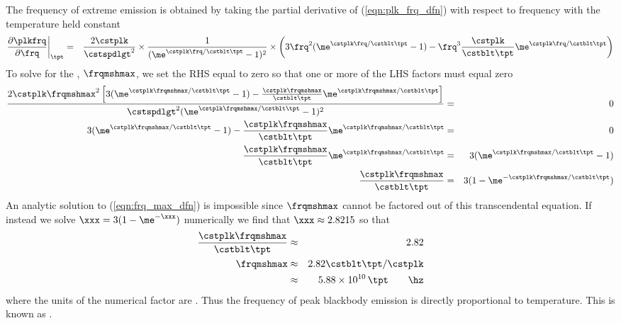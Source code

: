 \documentclass[12pt]{article}
\begin{document}
The frequency of extreme emission is obtained by taking the partial
derivative of (\ref{eqn:plk_frq_dfn}) with respect to frequency with
the temperature held constant
\begin{eqnarray}
\frac{\partial \plkfrq}{\partial \frq} 
\bigg|_{\tpt}
& = &
\frac{2 \cstplk}{\cstspdlgt^{2}} \times
\frac{1}{( \me^{\cstplk \frq / \cstblt \tpt}- 1)^{2}} \times
\left( 3 \frq^{2} ( \me^{\cstplk \frq / \cstblt \tpt}- 1) -
\frq^{3} \frac{\cstplk}{\cstblt \tpt} \me^{\cstplk \frq / \cstblt \tpt} \right)
\nonumber
\end{eqnarray}
To solve for the , $\frqmshmax$, 
we set the RHS equal to zero so that one or more of the LHS factors
must equal zero 
\begin{eqnarray}
\frac{2 \cstplk \frqmshmax^{2}
\left[ 3 ( \me^{\cstplk \frqmshmax / \cstblt \tpt}- 1 ) -
\frac{\cstplk \frqmshmax}{\cstblt \tpt} \me^{\cstplk \frqmshmax / \cstblt \tpt} \right] }
{\cstspdlgt^{2} ( \me^{\cstplk \frqmshmax / \cstblt \tpt}- 1)^{2}}
& = & 0
\nonumber \\
3 ( \me^{\cstplk \frqmshmax / \cstblt \tpt}- 1 ) -
\frac{\cstplk \frqmshmax}{\cstblt \tpt} \me^{\cstplk \frqmshmax / \cstblt \tpt}
& = & 0
\nonumber \\
\frac{\cstplk \frqmshmax}{\cstblt \tpt} \me^{\cstplk \frqmshmax / \cstblt \tpt}
& = &
3 ( \me^{\cstplk \frqmshmax / \cstblt \tpt}- 1 )
\nonumber \\
\frac{\cstplk \frqmshmax}{\cstblt \tpt}
& = &
3 ( 1 - \me^{-\cstplk \frqmshmax / \cstblt \tpt})
\label{eqn:frq_max_dfn}
\end{eqnarray}
An analytic solution to (\ref{eqn:frq_max_dfn}) is impossible since
$\frqmshmax$ cannot be factored out of this transcendental equation.
If instead we solve $\xxx = 3 ( 1 - \me^{-\xxx})$ numerically we find
that $\xxx \approx 2.8215$ so that 
\begin{eqnarray}
\frac{\cstplk \frqmshmax}{\cstblt \tpt} & \approx & 2.82 \nonumber \\
\frqmshmax & \approx & 2.82 \cstblt \tpt / \cstplk \nonumber \\
& \approx & 5.88 \times 10^{10} \, \tpt \qquad\mbox{\hz}
\label{eqn:frq_max_apx}
\end{eqnarray}
where the units of the numerical factor are \hzxk.
Thus the frequency of peak blackbody emission is directly
proportional to temperature.
This is known as .
\end{document}
